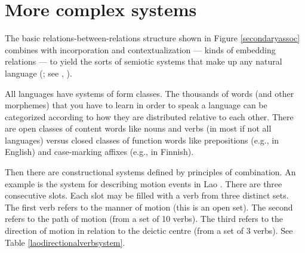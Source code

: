 
\section{More complex systems}


The basic relations-between-relations structure shown in Figure \ref{secondaryassoc} combines with incorporation and contextualization --- kinds of embedding relations --- to yield the sorts of semiotic systems that make up any natural language 
(\citealt{saussure_cours_1916}; see \citealt{dixon_basic_2010,dixon_basics_2014}, \citealt{bickel_linguistic_2014}). 



All languages have systems of form classes. The thousands of 
words (and other morphemes) that you have to learn in order to 
speak a language can be categorized according to how they are
distributed relative to each other. There are open classes of 
content words like nouns and verbs (in most if not all languages) versus closed classes of function 
words like prepositions (e.g., in English) and case-marking affixes 
(e.g., in Finnish). 



Then there are constructional systems defined by principles of combination. An example is the system for describing motion 
events in Lao \citep[387ff]{enfield_grammar_2007}. There are three consecutive 
slots. Each slot may be filled with a 
verb from three distinct sets. The first verb refers to the manner of 
motion (this is an open set). The second refers to the path of motion 
(from a set of 10 verbs). The third refers to the 
direction of motion in relation to the deictic centre (from a set 
of 3 verbs). See Table \ref{laodirectionalverbsystem}.


